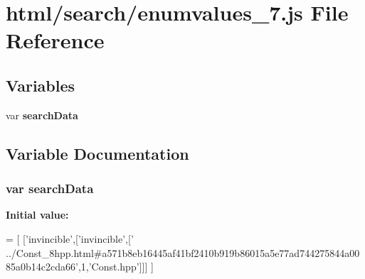 \section{html/search/enumvalues\-\_\-7.js File Reference}
\label{enumvalues__7_8js}
\subsection*{Variables}
\begin{DoxyCompactItemize}
\item 
var {\bf search\-Data}
\end{DoxyCompactItemize}


\subsection{Variable Documentation}
\subsubsection[{search\-Data}]{\setlength{\rightskip}{0pt plus 5cm}var search\-Data}\label{enumvalues__7_8js_ad01a7523f103d6242ef9b0451861231e}
{\bfseries Initial value\-:}
\begin{DoxyCode}
=
[
  [\textcolor{stringliteral}{'invincible'},[\textcolor{stringliteral}{'invincible'},[\textcolor{stringliteral}{'
      ../Const\_8hpp.html#a571b8eb16445af41bf2410b919b86015a5e77ad744275844a0085a0b14c2cda66'},1,\textcolor{stringliteral}{'Const.hpp'}]]]
]
\end{DoxyCode}
